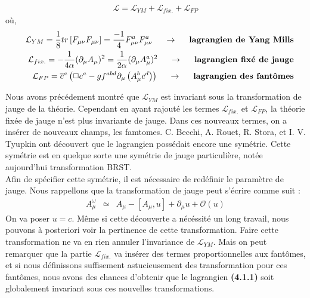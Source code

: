 \documentclass[a4paper,11pt]{article} %
\theoremstyle{plain}
\theoremstyle{definition}
\theoremstyle{remark}
\numberwithin{equation}{section}
\numberwithin{equation}{subsection}
\numberwithin{figure}{section}
\begin{document}
\begin{eqnarray*}
 \mathcal{L} = \mathcal{L}_{YM} +\mathcal{L}_{fix.} +\mathcal{L}_{FP}
\end{eqnarray*}
où,
\begin{eqnarray*}
 && \mathcal{L}_{YM} = \frac{1}{8} tr \left[ F_{\mu \nu}F_{\mu \nu} \right] = \frac{-1}{4} F^{a}_{\mu \nu}F^{a}_{\mu \nu}
\hspace{5mm} \rightarrow \hspace{5mm} \textbf{lagrangien de Yang Mills}\\
 && \mathcal{L}_{fix.} = - \frac{1}{4\alpha} (\partial_{\mu} A_{\mu})^{2} = \frac{1}{2\alpha} (\partial_{\mu} A^{a}_{\mu})^{2}
\hspace{5mm} \rightarrow \hspace{5mm} \textbf{lagrangien fixé de jauge}\\
 && \mathcal{L}_{FP} =  \overline{c}^{a} \left( \Box c^{a} -g f^{abd} \partial_{\mu} \left( A^{b}_{\mu} c^{d} \right) \right)
\hspace{5mm} \rightarrow \hspace{5mm} \textbf{lagrangien des fantômes}
\end{eqnarray*}

\noindent
Nous avons précédement montré que $\mathcal{L}_{YM}$ est invariant sous la transformation de jauge de la théorie. Cependant en ayant 
rajouté les termes $\mathcal{L}_{fix.}$ et $\mathcal{L}_{FP} $, la théorie fixée de jauge n'est plus invariante de jauge. Dans ces 
nouveaux termes, on a insérer de nouveaux champs, les famtomes. C. Becchi, A. Rouet, R. Stora, et I. V. Tyupkin ont découvert que 
le lagrangien possédait encore une symétrie. Cette symétrie est en quelque sorte une symétrie de jauge particulière, 
notée aujourd'hui transformation BRST. \\
Afin de spécifier cette symétrie, il est nécessaire de redéfinir le paramètre de jauge. Nous rappellons que la transformation de jauge 
peut s'écrire comme suit :
\begin{eqnarray*}
  A^{\omega}_{\mu} &\simeq& A_{\mu} - [A_{\mu},u] + \partial_{\mu}u + \mathcal{O} (u)
\end{eqnarray*}
On va poser $ u = c$. Même si cette découverte a nécéssité un long travail, nous pouvons à posteriori voir la pertinence de cette 
transformation. Faire cette transformation ne va en rien annuler l'invariance de $\mathcal{L}_{YM}$. Mais on peut remarquer que la 
partie $\mathcal{L}_{fix.}$ va insérer des termes proportionnelles aux fantômes, et si nous définissons suffisement astucieusement 
des transformation pour ces fantômes, nous avons des chances d'obtenir que le lagrangien \textbf{(4.1.1)}  soit globalement invariant 
sous ces nouvelles transformations.\\
\end{document}
